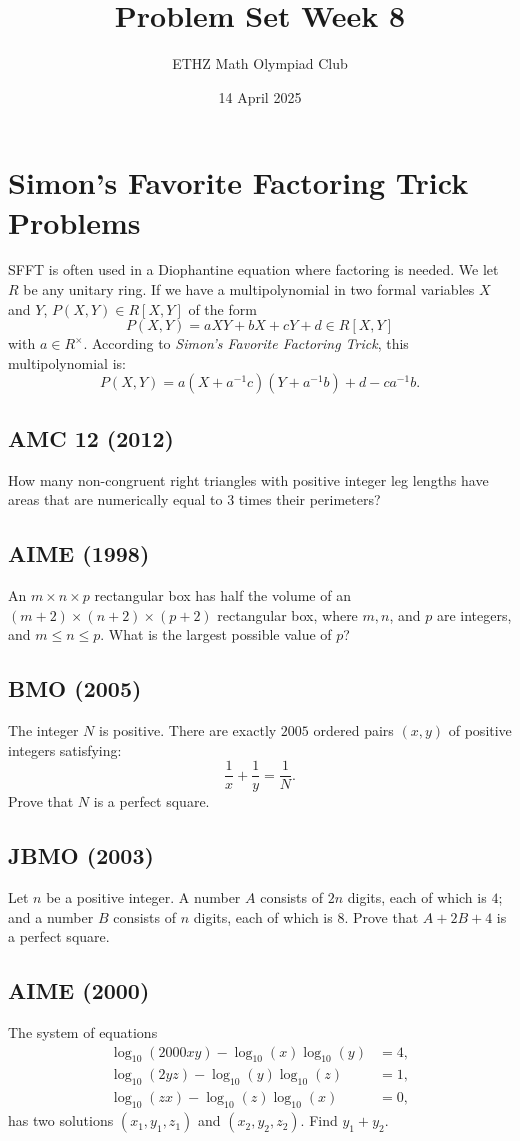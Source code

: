 \documentclass[11pt, a4paper, oneside]{article}
\title{Problem Set Week 8}
\author{ETHZ Math Olympiad Club}
\date{14 April 2025}
\newcommand{\problem}[1][]{\section{#1} \hfill \par}
\theoremstyle{remark}
\theoremstyle{lemma}
\begin{document}
\maketitle

\problem[Simon's Favorite Factoring Trick Problems] 
SFFT is often used in a Diophantine equation where factoring is needed. We let \( R \) be any unitary ring. If we have a multipolynomial in two formal variables \( X \) and \( Y \), \( P(X,Y) \in R[X,Y] \) of the form 
\[
P(X,Y) = aXY + bX + cY + d \in R[X,Y]
\] 
with \( a \in R^{\times} \). According to \textit{Simon's Favorite Factoring Trick}, this multipolynomial is:
\[
P(X,Y) = a\left(X + a^{-1}c\right)\left(Y + a^{-1}b\right) + d - ca^{-1}b.
\]

\subsection{AMC 12 (2012)} 
How many non-congruent right triangles with positive integer leg lengths have areas that are numerically equal to \( 3 \) times their perimeters?

\subsection{AIME (1998)} 
An \( m \times n \times p \) rectangular box has half the volume of an \( (m+2) \times (n+2) \times (p+2) \) rectangular box, where \( m, n \), and \( p \) are integers, and \( m \leq n \leq p \). What is the largest possible value of \( p \)?

\subsection{BMO (2005)} 
The integer \( N \) is positive. There are exactly \( 2005 \) ordered pairs \( (x,y) \) of positive integers satisfying:
\[
\frac{1}{x} + \frac{1}{y} = \frac{1}{N}.
\]
Prove that \( N \) is a perfect square.

\subsection{JBMO (2003)} 
Let \( n \) be a positive integer. A number \( A \) consists of \( 2n \) digits, each of which is \( 4 \); and a number \( B \) consists of \( n \) digits, each of which is \( 8 \). Prove that \( A + 2B + 4 \) is a perfect square.

\subsection{AIME (2000)} 
The system of equations
\begin{align*}
\log_{10}(2000xy) - \log_{10}\left(x\right)\log_{10}\left(y\right) &= 4, \\
\log_{10}(2yz) - \log_{10}\left(y\right)\log_{10}\left(z\right) &= 1, \\
\log_{10}(zx) - \log_{10}\left(z\right)\log_{10}\left(x\right) &= 0,
\end{align*}
has two solutions \( (x_{1},y_{1},z_{1}) \) and \( (x_{2},y_{2},z_{2}) \). Find \( y_{1} + y_{2} \).
\end{document}
